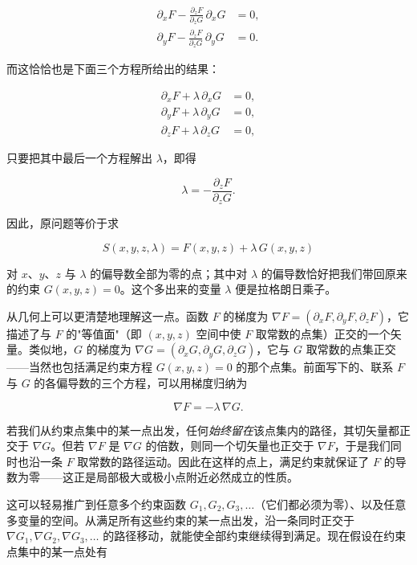 \begin{align}
\partial_{x}F - \frac{\partial_{z}F}{\partial_{z}G}\,\partial_{x}G &= 0, \\
\partial_{y}F - \frac{\partial_{z}F}{\partial_{z}G}\,\partial_{y}G &= 0 .
\end{align}

而这恰恰也是下面三个方程所给出的结果：

\begin{align}
\partial_{x}F + \lambda\,\partial_{x}G &= 0, \\
\partial_{y}F + \lambda\,\partial_{y}G &= 0, \\
\partial_{z}F + \lambda\,\partial_{z}G &= 0,
\end{align}

只要把其中最后一个方程解出 $\lambda$，即得

\begin{equation}
\lambda = -\frac{\partial_{z}F}{\partial_{z}G} .
\end{equation}

因此，原问题等价于求

\begin{equation}
S(x,y,z,\lambda)=F(x,y,z)+\lambda\,G(x,y,z)
\end{equation}

对 $x$、$y$、$z$ 与 $\lambda$ 的偏导数全部为零的点；其中对 $\lambda$ 的偏导数恰好把我们带回原来的约束 $G(x,y,z)=0$。这个多出来的变量 $\lambda$ 便是拉格朗日乘子。

从几何上可以更清楚地理解这一点。函数 $F$ 的梯度为 $\nabla F=(\partial_{x}F,\partial_{y}F,\partial_{z}F)$，它描述了与 $F$ 的"等值面"（即 $(x,y,z)$ 空间中使 $F$ 取常数的点集）正交的一个矢量。类似地，$G$ 的梯度为 $\nabla G=(\partial_{x}G,\partial_{y}G,\partial_{z}G)$，它与 $G$ 取常数的点集正交——当然也包括满足约束方程 $G(x,y,z)=0$ 的那个点集。前面写下的、联系 $F$ 与 $G$ 的各偏导数的三个方程，可以用梯度归纳为

\begin{equation}
\nabla F = -\lambda\,\nabla G .
\end{equation}

若我们从约束点集中的某一点出发，任何\emph{始终留在}该点集内的路径，其切矢量都正交于 $\nabla G$。但若 $\nabla F$ 是 $\nabla G$ 的倍数，则同一个切矢量也正交于 $\nabla F$，于是我们同时也沿一条 $F$ 取常数的路径运动。因此在这样的点上，满足约束就保证了 $F$ 的导数为零——这正是局部极大或极小点附近必然成立的性质。

这可以轻易推广到任意多个约束函数 $G_1,G_2,G_3,\dots$（它们都必须为零）、以及任意多变量的空间。从满足所有这些约束的某一点出发，沿一条同时正交于 $\nabla G_1,\nabla G_2,\nabla G_3,\dots$ 的路径移动，就能使全部约束继续得到满足。现在假设在约束点集中的某一点处有

